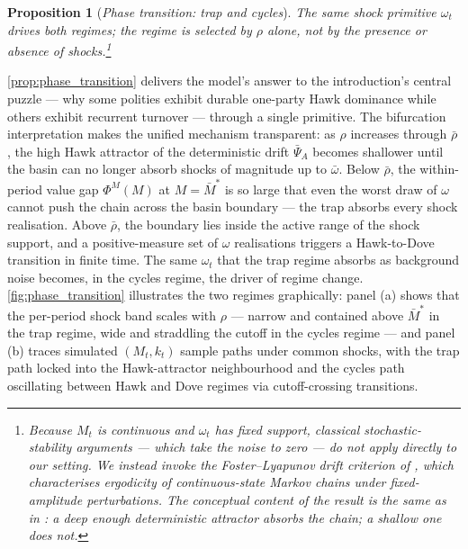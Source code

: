 \documentclass[11pt,twoside]{extarticle}
\newtheorem{proposition}{Proposition}
\begin{document}
\begin{proposition}[\emph{Phase transition: trap and cycles}]
\smallskip
\noindent The same shock primitive $\omega_t$ drives both regimes; the regime is selected by $\rho$ alone, not by the presence or absence of shocks.\footnote{Because $M_t$ is continuous and $\omega_t$ has fixed support, classical stochastic-stability arguments — which take the noise to zero — do not apply directly to our setting. We instead invoke the Foster–Lyapunov drift criterion of \citet[Ch.~14–15]{meynMarkovChainsStochastic2012}, which characterises ergodicity of continuous-state Markov chains under fixed-amplitude perturbations. The conceptual content of the result is the same as in \citet{youngEvolutionConventions1993}: a deep enough deterministic attractor absorbs the chain; a shallow one does not.}
\end{proposition}

\autoref{prop:phase_transition} delivers the model's answer to the introduction's central puzzle — why some polities exhibit durable one-party Hawk dominance while others exhibit recurrent turnover — through a single primitive. The bifurcation interpretation makes the unified mechanism transparent: as $\rho$ increases through $\bar\rho$, the high Hawk attractor of the deterministic drift $\bar\Psi_A$ becomes shallower until the basin can no longer absorb shocks of magnitude up to $\bar\omega$. Below $\bar\rho$, the within-period value gap $\Phi^M(M)$ at $M=\bar M^*$ is so large that even the worst draw of $\omega$ cannot push the chain across the basin boundary — the trap absorbs every shock realisation. Above $\bar\rho$, the boundary lies inside the active range of the shock support, and a positive-measure set of $\omega$ realisations triggers a Hawk-to-Dove transition in finite time. The same $\omega_t$ that the trap regime absorbs as background noise becomes, in the cycles regime, the driver of regime change. \autoref{fig:phase_transition} illustrates the two regimes graphically: panel (a) shows that the per-period shock band scales with $\rho$ — narrow and contained above $\bar M^*$ in the trap regime, wide and straddling the cutoff in the cycles regime — and panel (b) traces simulated $(M_t,k_t)$ sample paths under common shocks, with the trap path locked into the Hawk-attractor neighbourhood and the cycles path oscillating between Hawk and Dove regimes via cutoff-crossing transitions.
\end{document}
